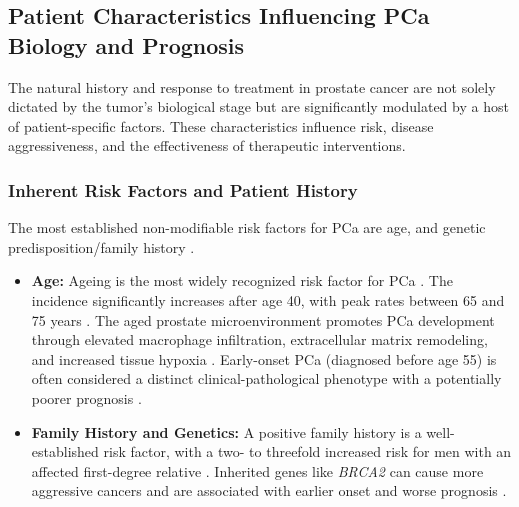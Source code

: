 \documentclass[11pt, a4paper]{article}
\begin{document}
\subsection{Patient Characteristics Influencing PCa Biology and Prognosis}
The natural history and response to treatment in prostate cancer are not solely dictated by the tumor's biological stage but are significantly modulated by a host of patient-specific factors. These characteristics influence risk, disease aggressiveness, and the effectiveness of therapeutic interventions.

\subsubsection{Inherent Risk Factors and Patient History}
The most established non-modifiable risk factors for PCa are age, and genetic predisposition/family history \cite{UnknownAuthor2017, PerezCornagoDunneram2021}.
\begin{itemize}
    \item \textbf{Age:} Ageing is the most widely recognized risk factor for PCa \cite{UnknownAuthor2017, KaderBrangsch2021}. The incidence significantly increases after age 40, with peak rates between 65 and 75 years \cite{BianchiFriasDamodarasamy2019, UnknownAuthor2017}. The aged prostate microenvironment promotes PCa development through elevated macrophage infiltration, extracellular matrix remodeling, and increased tissue hypoxia \cite{BianchiFriasDamodarasamy2019, MartinCaraballo2024}. Early-onset PCa (diagnosed before age 55) is often considered a distinct clinical-pathological phenotype with a potentially poorer prognosis \cite{OrzechowskaAnusewicz2022, MilonasVenclovas2017}.
    \item \textbf{Family History and Genetics:} A positive family history is a well-established risk factor, with a two- to threefold increased risk for men with an affected first-degree relative \cite{CarpagnanoEusebi2020, UnknownAuthor2017}. Inherited genes like \textit{BRCA2} can cause more aggressive cancers and are associated with earlier onset and worse prognosis \cite{UnknownAuthor2017, CarpagnanoEusebi2020, JiHuang2017, ChenWang2023}.
\end{itemize}
\end{document}
